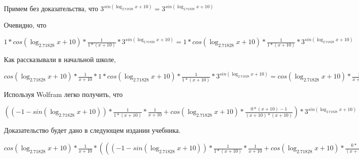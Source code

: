\documentclass[12pt,a4paper,fleqn]{article}
\theoremstyle{definition}
\begin{document}
Примем без доказательства, что
${ 3 }^{sin(\log_{ 2.71828 }{ x  +  10 })} = { 3 }^{sin(\log_{ 2.71828 }{ x  +  10 })}$

Очевидно, что

$ 1  * cos(\log_{ 2.71828 }{ x  +  10 }) * \frac{ 1 }{ 1  * ( x  +  10 )}
 * { 3 }^{sin(\log_{ 2.71828 }{ x  +  10 })} =  1  * cos(\log_{ 2.71828 }{ x  +  10 }) * \frac{ 1 }{ 1  * ( x  +  10 )}
 * { 3 }^{sin(\log_{ 2.71828 }{ x  +  10 })}$

Как рассказывали в начальной школе,

$cos(\log_{ 2.71828 }{ x  +  10 }) * \frac{ 1 }{ x  +  10 }
 *  1  * cos(\log_{ 2.71828 }{ x  +  10 }) * \frac{ 1 }{ 1  * ( x  +  10 )}
 * { 3 }^{sin(\log_{ 2.71828 }{ x  +  10 })} = cos(\log_{ 2.71828 }{ x  +  10 }) * \frac{ 1 }{ x  +  10 }
 *  1  * cos(\log_{ 2.71828 }{ x  +  10 }) * \frac{ 1 }{ 1  * ( x  +  10 )}
 * { 3 }^{sin(\log_{ 2.71828 }{ x  +  10 })}$

Используя Wolfram легко получить, что

$(( -1  - sin(\log_{ 2.71828 }{ x  +  10 })) * \frac{ 1 }{ 1  * ( x  +  10 )}
 * \frac{ 1 }{ x  +  10 }
 + cos(\log_{ 2.71828 }{ x  +  10 }) * \frac{ 0  * ( x  +  10 ) -  1 }{( x  +  10 ) * ( x  +  10 )}
) * { 3 }^{sin(\log_{ 2.71828 }{ x  +  10 })} + cos(\log_{ 2.71828 }{ x  +  10 }) * \frac{ 1 }{ x  +  10 }
 *  1  * cos(\log_{ 2.71828 }{ x  +  10 }) * \frac{ 1 }{ 1  * ( x  +  10 )}
 * { 3 }^{sin(\log_{ 2.71828 }{ x  +  10 })} = (( -1  - sin(\log_{ 2.71828 }{ x  +  10 })) * \frac{ 1 }{ 1  * ( x  +  10 )}
 * \frac{ 1 }{ x  +  10 }
 + cos(\log_{ 2.71828 }{ x  +  10 }) * \frac{ 0  * ( x  +  10 ) -  1 }{( x  +  10 ) * ( x  +  10 )}
) * { 3 }^{sin(\log_{ 2.71828 }{ x  +  10 })} + cos(\log_{ 2.71828 }{ x  +  10 }) * \frac{ 1 }{ x  +  10 }
 *  1  * cos(\log_{ 2.71828 }{ x  +  10 }) * \frac{ 1 }{ 1  * ( x  +  10 )}
 * { 3 }^{sin(\log_{ 2.71828 }{ x  +  10 })}$

Доказательство будет дано в следующем издании учебника.

$cos(\log_{ 2.71828 }{ x  +  10 }) * \frac{ 1 }{ x  +  10 }
 * ((( -1  - sin(\log_{ 2.71828 }{ x  +  10 })) * \frac{ 1 }{ 1  * ( x  +  10 )}
 * \frac{ 1 }{ x  +  10 }
 + cos(\log_{ 2.71828 }{ x  +  10 }) * \frac{ 0  * ( x  +  10 ) -  1 }{( x  +  10 ) * ( x  +  10 )}
) * { 3 }^{sin(\log_{ 2.71828 }{ x  +  10 })} + cos(\log_{ 2.71828 }{ x  +  10 }) * \frac{ 1 }{ x  +  10 }
 *  1  * cos(\log_{ 2.71828 }{ x  +  10 }) * \frac{ 1 }{ 1  * ( x  +  10 )}
 * { 3 }^{sin(\log_{ 2.71828 }{ x  +  10 })}) = cos(\log_{ 2.71828 }{ x  +  10 }) * \frac{ 1 }{ x  +  10 }
 * ((( -1  - sin(\log_{ 2.71828 }{ x  +  10 })) * \frac{ 1 }{ 1  * ( x  +  10 )}
 * \frac{ 1 }{ x  +  10 }
 + cos(\log_{ 2.71828 }{ x  +  10 }) * \frac{ 0  * ( x  +  10 ) -  1 }{( x  +  10 ) * ( x  +  10 )}
) * { 3 }^{sin(\log_{ 2.71828 }{ x  +  10 })} + cos(\log_{ 2.71828 }{ x  +  10 }) * \frac{ 1 }{ x  +  10 }
 *  1  * cos(\log_{ 2.71828 }{ x  +  10 }) * \frac{ 1 }{ 1  * ( x  +  10 )}
 * { 3 }^{sin(\log_{ 2.71828 }{ x  +  10 })})$
\end{document}
